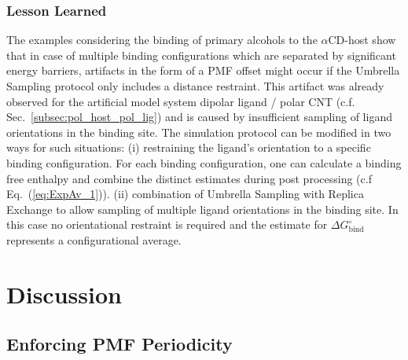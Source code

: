 \documentclass[9pt,lessons]{livecoms}
\begin{document}
\subsubsection*{Lesson Learned}

The examples considering the binding of primary alcohols to the $\alpha$CD-host show that in case of multiple binding configurations which are separated by significant energy barriers, 
artifacts in the form of a PMF offset might occur if the Umbrella Sampling protocol only includes a distance restraint.
This artifact was already observed for the artificial model system dipolar ligand / polar CNT (c.f. Sec.~\ref{subsec:pol_host_pol_lig}) and is caused by insufficient sampling of ligand orientations in the binding site. 
The  simulation protocol can be modified in two ways for such situations: 
(i) restraining the ligand's orientation to a specific binding configuration. 
For each binding configuration, one can calculate a binding free enthalpy and combine the distinct estimates during post processing (c.f Eq.~(\ref{eq:ExpAv_1})).
(ii) combination of Umbrella Sampling with Replica Exchange to allow sampling of multiple ligand orientations in the binding site. 
In this case no orientational restraint is required and the estimate for $\Delta G^\circ_\mathrm{bind}$ represents a configurational average.

\section{Discussion}

\subsection{Enforcing PMF Periodicity}
\end{document}
